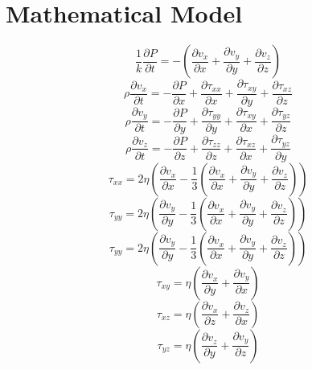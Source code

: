 \section*{\myfont Mathematical Model} %
\begin{equation}
	\frac{1}{k}\frac{\partial P}{\partial t} = -\left(\frac{\partial v_x}{\partial x} + \frac{\partial v_y}{\partial y} + \frac{\partial v_z}{\partial z}\right)
\end{equation}
\begin{equation}
	\rho \frac{\partial v_x}{\partial t} = - \frac{\partial P}{\partial x} + \frac{\partial \tau_{xx}}{\partial x} + \frac{\partial \tau_{xy}}{\partial y} + \frac{\partial \tau_{xz}}{\partial z}
\end{equation}
\begin{equation}
	\rho \frac{\partial v_y}{\partial t} = - \frac{\partial P}{\partial y} + \frac{\partial \tau_{yy}}{\partial y} + \frac{\partial \tau_{xy}}{\partial x} + \frac{\partial \tau_{yz}}{\partial z}
\end{equation}
\begin{equation}
	\rho \frac{\partial v_z}{\partial t} = - \frac{\partial P}{\partial z} + \frac{\partial \tau_{zz}}{\partial z} + \frac{\partial \tau_{xz}}{\partial x} + \frac{\partial \tau_{yz}}{\partial y}
\end{equation}
\begin{equation}
	\tau_{xx} = 2 \eta \left( \frac{\partial v_x}{\partial x} - \frac{1}{3}\left(\frac{\partial v_x}{\partial x} + \frac{\partial v_y}{\partial y} + \frac{\partial v_z}{\partial z}\right)\right)
\end{equation}
\begin{equation}
	\tau_{yy} = 2 \eta \left( \frac{\partial v_y}{\partial y} - \frac{1}{3}\left(\frac{\partial v_x}{\partial x} + \frac{\partial v_y}{\partial y} + \frac{\partial v_z}{\partial z}\right)\right)
\end{equation}
\begin{equation}
	\tau_{yy} = 2 \eta \left( \frac{\partial v_y}{\partial y} - \frac{1}{3}\left(\frac{\partial v_x}{\partial x} + \frac{\partial v_y}{\partial y} + \frac{\partial v_z}{\partial z}\right)\right)
\end{equation}
\begin{equation}
	\tau_{xy} = \eta \left(\frac{\partial v_x}{\partial y} + \frac{\partial v_y}{\partial x}\right)
\end{equation}
\begin{equation}
	\tau_{xz} = \eta \left(\frac{\partial v_x}{\partial z} + \frac{\partial v_z}{\partial x}\right)
\end{equation}
\begin{equation}
	\tau_{yz} = \eta \left(\frac{\partial v_z}{\partial y} + \frac{\partial v_y}{\partial z}\right)
\end{equation}
